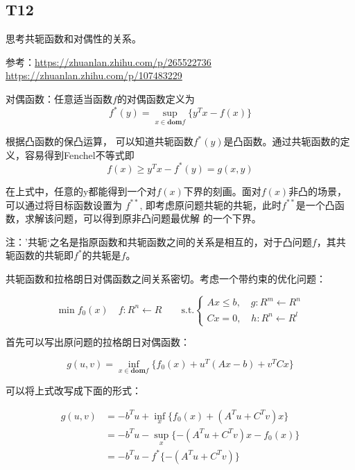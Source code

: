 \documentclass[a4paper]{article}
\begin{document}
    \subsection*{T12}

    思考共轭函数和对偶性的关系。

    参考：\url{https://zhuanlan.zhihu.com/p/265522736}\\
    \url{https://zhuanlan.zhihu.com/p/107483229}

    对偶函数：任意适当函数$f$的对偶函数定义为
    \begin{equation*}
        f^*(y) = \sup_{x \in \mathbf{dom} f} \{ y^Tx - f(x)\}
    \end{equation*}

    根据凸函数的保凸运算， 可以知道共轭函数$f^*(y)$是凸函数。通过共轭函数的定义，容易得到Fenchel不等式即
    \begin{equation*}
        f(x) \ge y^Tx - f^*(y) = g(x,y)
    \end{equation*}

    在上式中，任意的y都能得到一个对$f(x)$下界的刻画。面对$f(x)$非凸的场景，可以通过将目标函数设置为
    $f^{**}$, 即考虑原问题共轭的共轭，此时$f^{**}$是一个凸函数，求解该问题，可以得到原非凸问题最优解
    的一个下界。

    注：’共轭‘之名是指原函数和共轭函数之间的关系是相互的，对于凸问题$f$，其共轭函数的共轭即$f^*$的共轭是$f$。

    共轭函数和拉格朗日对偶函数之间关系密切。考虑一个带约束的优化问题：

    \begin{equation*}
        \min f_0(x) \quad f: R^n \leftarrow R \quad \quad \text{s.t.} 
        \begin{cases}
            Ax \le b, \quad  g: R^m \leftarrow R^n\\
            Cx=0, \quad  h: R^n \leftarrow R^l
        \end{cases}
    \end{equation*}  

    首先可以写出原问题的拉格朗日对偶函数：

    \begin{equation*}
        g(u, v) = \inf_{x \in \mathbf{dom} f} \{ f_0(x) + u^T (Ax-b) + v^TCx\} 
    \end{equation*}

    可以将上式改写成下面的形式：

    \begin{align*}
        g(u,v) &= -b^Tu + \inf_x \{ f_0(x) + (A^Tu+C^Tv)x\} \\
        &= -b^Tu - \sup_x \{ - (A^Tu+C^Tv)x - f_0(x)\} \\
        &= -b^Tu - f^*\{ - (A^Tu+C^Tv)\} 
    \end{align*}
\end{document}
